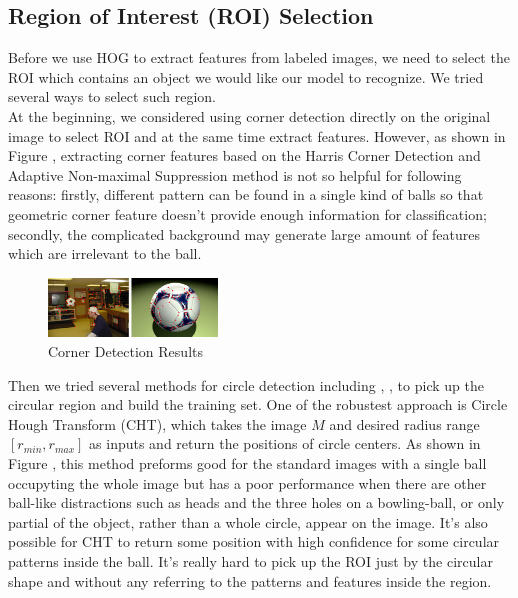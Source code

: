 \documentclass{article}
\begin{document}
\subsection{Region of Interest (ROI) Selection}
Before we use HOG to extract features from labeled images, we need to select the ROI which contains an object we would like our model to recognize. We tried several ways to select such region.\\
At the beginning, we considered using corner detection directly on the original image to select ROI and at the same time extract features. However, as shown in Figure \cite{crd}, extracting corner features based on the Harris Corner Detection and Adaptive Non-maximal Suppression method \cite{brown2005multi} is not so helpful for following reasons: firstly, different pattern can be found in a single kind of balls so that geometric corner feature doesn't provide enough information for classification; secondly, the complicated background may generate large amount of features which are irrelevant to the ball.\\


\begin{figure}[htp]
\centering
\includegraphics[width=0.4\textwidth]{CornerDetection.jpg}
\caption{Corner Detection Results}
\label{fig:crd}
\end{figure}

Then we tried several methods for circle detection including \cite{cirDetect1}, \cite{cirDetect2}, \cite{cirDetect3} to pick up the circular region and build the training set. One of the robustest approach is Circle Hough Transform (CHT), which takes the image $M$ and desired radius range $[r_{min},r_{max}]$ as inputs and return the positions of circle centers. As shown in Figure \cite{cird}, this method preforms good for the standard images with a single ball occupyting the whole image but has a poor performance when there are other ball-like distractions such as heads and the three holes on a bowling-ball, or only partial of the object, rather than a whole circle, appear on the image. It's also possible for CHT to return some position with high confidence for some circular patterns inside the ball. It's really hard to pick up the ROI just by the circular shape and without any referring to the patterns and features inside the region. \\
\end{document}
